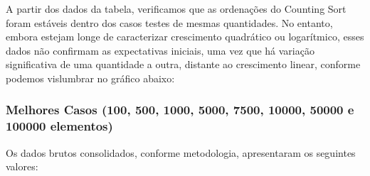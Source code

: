 \documentclass[a4paper, 12pt]{article}
\begin{document}
A partir dos dados da tabela, verificamos que as ordenações do Counting Sort foram estáveis dentro dos casos testes de mesmas quantidades. No entanto, embora estejam longe de caracterizar crescimento quadrático ou logarítmico, esses dados não confirmam as expectativas iniciais, uma vez que há variação significativa de uma quantidade a outra, distante ao crescimento linear, conforme podemos vislumbrar no gráfico abaixo:
\vspace{0.3cm}
\begin{center}
\end{center}

\subsubsection{Melhores Casos (100, 500, 1000, 5000, 7500, 10000, 50000 e 100000 elementos)}
\tab{ }Os dados brutos consolidados, conforme metodologia, apresentaram os seguintes valores:
\vspace{0.3cm}
\end{document}

